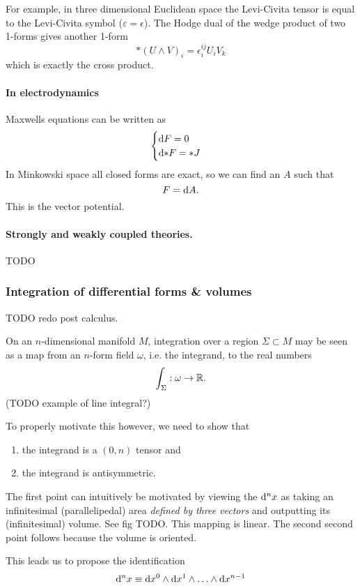 For example, in three dimensional Euclidean space the Levi-Civita tensor is equal to the Levi-Civita symbol ($\varepsilon = \epsilon$). The Hodge dual of the wedge product of two 1-forms gives another 1-form
\[ *(U\wedge V)_i = \epsilon_i^{ij}U_iV_k \]
which is exactly the cross product.

\paragraph{In electrodynamics} Maxwells equations can be written as
\[ \begin{cases}
\operatorname{d \!}{F} = 0 \\ \operatorname{d \!}{*F} = *J
\end{cases} \]
In Minkowski space all closed forms are exact, so we can find an $A$ such that
\[ F = \operatorname{d \!}{A}. \]
This is the vector potential.
\paragraph{Strongly and weakly coupled theories.} TODO


\subsubsection{Integration of differential forms \& volumes}
TODO redo post calculus.

On an $n$-dimensional manifold $M$, integration over a region $\Sigma \subset M$ may be seen as a map from an $n$-form field $\omega$, i.e. the integrand, to the real numbers
\[ \int_\Sigma: \omega \to \mathbb{R}. \]
(TODO example of line integral?)

To properly motivate this however, we need to show that
\begin{enumerate}
\item the integrand is a $(0,n)$ tensor and
\item the integrand is antisymmetric.
\end{enumerate}
The first point can intuitively be motivated by viewing the $\operatorname{d \!}{^nx}$ as taking an infinitesimal (parallelipedal) area \textit{defined by three vectors} and outputting its (infinitesimal) volume. See fig TODO. This mapping is linear.
The second second point follows because the volume is oriented.

This leads us to propose the identification
\begin{equation}
\operatorname{d \!}{^nx} \equiv \operatorname{d \!}{x^0}\wedge \operatorname{d \!}{x^1}\wedge \ldots \wedge \operatorname{d \!}{x^{n-1}} \label{eq:diffTransfRule}
\end{equation}


